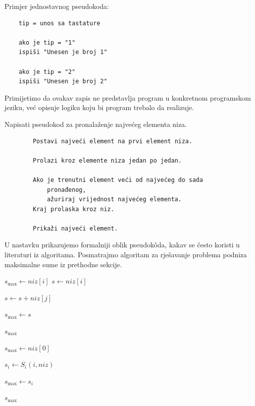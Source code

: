 Primjer jednostavnog pseudokoda:

\begin{verbatim}
	tip = unos sa tastature
	
	ako je tip = "1"
	ispiši "Unesen je broj 1"
	
	ako je tip = "2"
	ispiši "Unesen je broj 2"
\end{verbatim}

Primijetimo da ovakav zapis ne predstavlja program u konkretnom programskom jeziku, već opisuje logiku koju bi program trebalo da realizuje.

\begin{example}
	Napisati pseudokod za pronalaženje najvećeg elementa niza.
	
	\begin{verbatim}
		Postavi najveći element na prvi element niza.
		
		Prolazi kroz elemente niza jedan po jedan.
		
		Ako je trenutni element veći od najvećeg do sada 
	        pronađenog,
		    ažuriraj vrijednost najvećeg elementa.
		Kraj prolaska kroz niz.
		
		Prikaži najveći element.
	\end{verbatim}
	
\end{example}

U nastavku prikazujemo formalniji oblik pseudok\^oda, kakav se često koristi u literaturi iz algoritama. Posmatrajmo algoritam za rješavanje problema podniza maksimalne sume iz prethodne sekcije.

\begin{algorithm}[!ht]
	\caption{Funkcija $S_i(i)$}
	\label{S_i}
	\begin{algorithmic}[1]

		\State $s_{\max} \gets niz[i]$
		\State $s \gets niz[i]$
		
		\State $s \gets s + niz[j]$
		
		\State $s_{\max} \gets s$
		\EndIf
		
		\EndFor
		
		\State \Return $s_{\max}$
		
		\EndProcedure
	\end{algorithmic}
\end{algorithm}

\begin{algorithm}[H]
	\caption{Funkcija $S$}
	\label{S}
	\begin{algorithmic}[1]
		\State $s_{\max} \gets niz[0]$
		
		
		\State $s_i \gets S_i(i,niz)$
		
		\State $s_{\max} \gets s_i$
		\EndIf
		
		\EndFor
		
		\State \Return $s_{\max}$
		
		\EndProcedure
	\end{algorithmic}
\end{algorithm}

